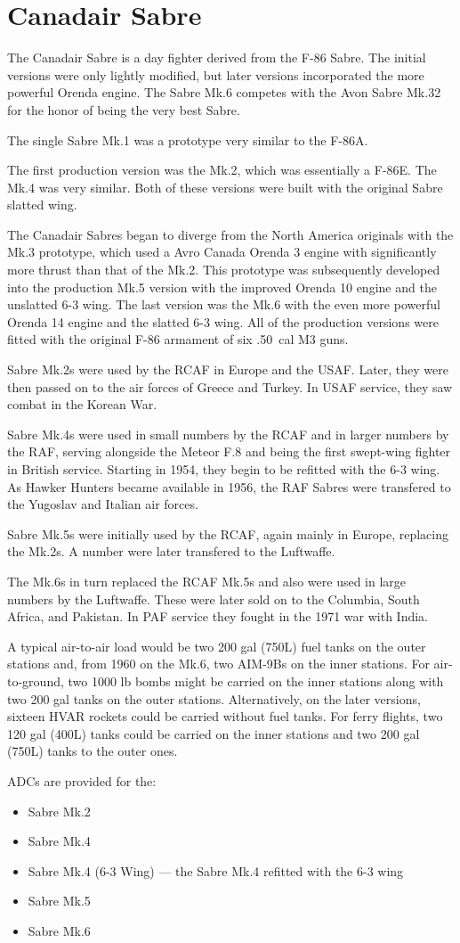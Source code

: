 \section*{Canadair Sabre}

The Canadair Sabre is a day fighter derived from the F-86 Sabre. The initial versions were only lightly modified, but later versions incorporated the more powerful Orenda engine. The Sabre Mk.6 competes with the Avon Sabre Mk.32  for the honor of being the very best Sabre.

The single Sabre Mk.1 was a prototype very similar to the F-86A. 

The first production version was the Mk.2, which was essentially a F-86E. The Mk.4 was very similar. Both of these versions were built with the original Sabre slatted wing.

The Canadair Sabres began to diverge from the North America originals with the Mk.3 prototype, which used a Avro Canada Orenda 3 engine with significantly more thrust than that of the Mk.2. This prototype was subsequently developed into the production Mk.5 version with the improved Orenda 10 engine and the unslatted 6-3 wing. The last version was the Mk.6 with the even more powerful Orenda 14 engine and the slatted 6-3 wing. All of the production versions were fitted with the original F-86 armament of six .50~cal M3 guns.

Sabre Mk.2s were used by the RCAF in Europe and the USAF. Later, they were then passed on to the air forces of Greece and Turkey. In USAF service, they saw combat in the Korean War.

Sabre Mk.4s were used in small numbers by the RCAF and in larger numbers by the RAF, serving alongside the Meteor F.8 and being the first swept-wing fighter in British service. Starting in 1954, they begin to be refitted with the 6-3 wing. As Hawker Hunters became available in 1956, the RAF Sabres were transfered to the Yugoslav and Italian air forces.

Sabre Mk.5s were initially used by the RCAF, again mainly in Europe, replacing the Mk.2s. A number were later transfered to the Luftwaffe.

The Mk.6s in turn replaced the RCAF Mk.5s and also were used in large numbers by the Luftwaffe. These were later sold on to the Columbia, South Africa, and Pakistan. In PAF service they fought in the 1971 war with India.

A typical air-to-air load would be two 200 gal (750L) fuel tanks on the outer stations and, from 1960 on the Mk.6, two AIM-9Bs on the inner stations. For air-to-ground, two 1000 lb bombs might be carried on the inner stations along with two 200 gal tanks on the outer stations. Alternatively, on the later versions, sixteen HVAR rockets could be carried without fuel tanks. For ferry flights, two 120 gal (400L) tanks could be carried on the inner stations and two 200 gal (750L) tanks to the outer ones.

ADCs are provided for the:
\begin{itemize}
\item Sabre Mk.2
\item Sabre Mk.4
\item Sabre Mk.4 (6-3 Wing) --- the Sabre Mk.4 refitted with the 6-3 wing
\item Sabre Mk.5
\item Sabre Mk.6
\end{itemize}
